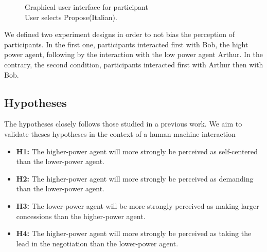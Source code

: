 \documentclass[runningheads,a4paper]{llncs}
\begin{document}
		\begin{figure}[t]
			\centering
			\caption{Graphical user interface for participant
				\\ User selects Propose(Italian).}
			\label{ihm}
		\end{figure}
		
		We defined two experiment designs in order to not bias the perception of participants. In the first one, participants interacted first with Bob, the hight power agent, following by the interaction with the low power agent Arthur. In the contrary, the second condition, participants interacted first with Arthur then with Bob. 
		 
		\subsection{Hypotheses}
			The hypotheses closely follows those studied in a previous work. We aim to validate theses hypotheses in the context of a human machine interaction
			
			\begin{itemize}
					\item  \textbf{H1:} The higher-power agent will more strongly be perceived as self-centered than the lower-power agent.  
					
					\item \textbf{H2:}  The higher-power agent will more strongly be perceived as demanding than the lower-power agent.
										
					\item \textbf{H3:} The lower-power agent will be more strongly perceived as making larger concessions than the higher-power agent.
					
					\item \textbf{H4:}  The higher-power agent will more strongly be perceived as taking the lead in the negotiation than the lower-power agent.
					
				\end{itemize}
				
\end{document}
